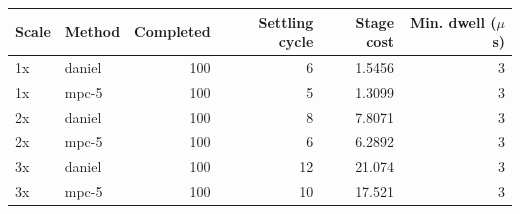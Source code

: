 \begin{tabular}{llrrrr}
\toprule
Scale & Method & Completed & Settling cycle & Stage cost & Min. dwell ($\mu$s) \\ \midrule
1x & daniel & 100 & 6 & 1.5456 & 3 \\ 
1x & mpc-5 & 100 & 5 & 1.3099 & 3 \\ 
2x & daniel & 100 & 8 & 7.8071 & 3 \\ 
2x & mpc-5 & 100 & 6 & 6.2892 & 3 \\ 
3x & daniel & 100 & 12 & 21.074 & 3 \\ 
3x & mpc-5 & 100 & 10 & 17.521 & 3 \\ 
\bottomrule
\end{tabular}
